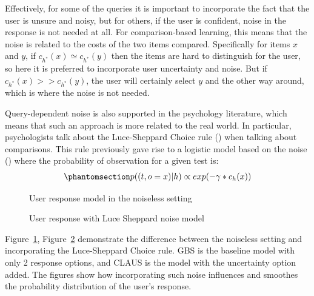 \documentclass[
  letterpaper,
  numbers=noenddot,
  DIV=11]{scrreprt}
\theoremstyle{definition}
\theoremstyle{plain}
\theoremstyle{plain}
\theoremstyle{remark}
\begin{document}
Effectively, for some of the queries it is important to incorporate the
fact that the user is unsure and noisy, but for others, if the user is
confident, noise in the response is not needed at all. For
comparison-based learning, this means that the noise is related to the
costs of the two items compared. Specifically for items \(x\) and \(y\),
if \(c_{h^*}(x) \simeq c_{h^*}(y)\) then the items are hard to
distinguish for the user, so here it is preferred to incorporate user
uncertainty and noise. But if \(c_{h^*}(x) >> c_{h^*}(y)\), the user
will certainly select \(y\) and the other way around, which is where the
noise is not needed.

Query-dependent noise is also supported in the psychology literature,
which means that such an approach is more related to the real world. In
particular, psychologists talk about the Luce-Sheppard Choice rule
() when talking about comparisons.
This rule previously gave rise to a logistic model based on the noise
() where the
probability of observation for a given test is:
\begin{equation}\phantomsection\label{eq-noise_model}{\begin{aligned}
    p((t, o = x) | h) \propto exp(-\gamma * c_h(x))
\end{aligned}}\end{equation}

\begin{figure}


\caption{\label{fig-noiseless_1}User response model in the noiseless
setting}

\end{figure}%

\begin{figure}


\caption{\label{fig-noiseless_2}User response with Luce Sheppard noise
model}

\end{figure}%

Figure~\ref{fig-noiseless_1}, Figure~\ref{fig-noiseless_2} demonstrate
the difference between the noiseless setting and incorporating the
Luce-Sheppard Choice rule. GBS is the baseline model with only 2
response options, and CLAUS is the model with the uncertainty option
added. The figures show how incorporating such noise influences and
smoothes the probability distribution of the user's response.
\end{document}
